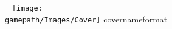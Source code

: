 \documentclass[sheet]{gameki}
\begin{document}
\pagestyle{empty}

\begin{center}
~
\vfill
{\Huge\gamename}
\vfill
\texttt{[image: \\gamepath/Images/Cover]}
\vfill
{\Huge\csname covernameformat\endcsname\csname\jobname\endcsname{\full}}
\vfill
{\huge\csname\jobname\endcsname{\MYplayer}}
\end{center}
\end{document}
